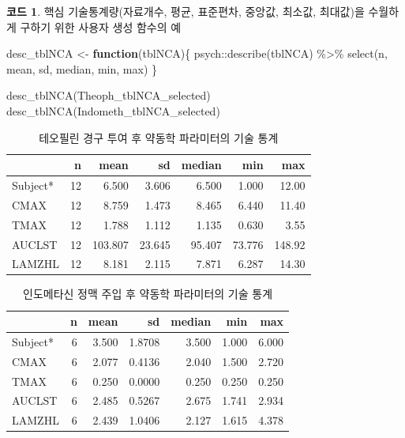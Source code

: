 \documentclass[
  11pt,
  krantz2, a4paper, twoside]{krantz}
\newenvironment{Shaded}{\begin{snugshade}}{\end{snugshade}}
\newcommand{\ControlFlowTok}[1]{\textcolor[rgb]{0.13,0.29,0.53}{\textbf{#1}}}
\newcommand{\FunctionTok}[1]{\textcolor[rgb]{0.00,0.00,0.00}{#1}}
\newcommand{\NormalTok}[1]{#1}
\newcommand{\OtherTok}[1]{\textcolor[rgb]{0.56,0.35,0.01}{#1}}
\newcommand{\SpecialCharTok}[1]{\textcolor[rgb]{0.00,0.00,0.00}{#1}}
\theoremstyle{definition}
\theoremstyle{definition}
\newtheorem{example}{코드}[chapter]
\theoremstyle{definition}
\theoremstyle{definition}
\theoremstyle{remark}
\begin{document}
\begin{example}
\protect\hypertarget{exm:desctblnca}{}{\label{exm:desctblnca} }핵심 기술통계량(자료개수, 평균, 표준편차, 중앙값, 최소값, 최대값)을 수월하게 구하기 위한 사용자 생성 함수의 예
\end{example}
\vspace{-2ex}

\begin{Shaded}
\begin{Highlighting}[]
\NormalTok{desc\_tblNCA }\OtherTok{\textless{}{-}} \ControlFlowTok{function}\NormalTok{(tblNCA)\{}
\NormalTok{  psych}\SpecialCharTok{::}\FunctionTok{describe}\NormalTok{(tblNCA) }\SpecialCharTok{\%\textgreater{}\%}
    \FunctionTok{select}\NormalTok{(n, mean, sd, median, min, max)}
\NormalTok{\}}
\end{Highlighting}
\end{Shaded}

\begin{Shaded}
\begin{Highlighting}[]
\FunctionTok{desc\_tblNCA}\NormalTok{(Theoph\_tblNCA\_selected)}
\FunctionTok{desc\_tblNCA}\NormalTok{(Indometh\_tblNCA\_selected)}
\end{Highlighting}
\end{Shaded}

\begin{table}

\caption{\label{tab:theodesc}테오필린 경구 투여 후 약동학 파라미터의 기술 통계}
\centering
\begin{tabular}[t]{lrrrrrr}
\toprule
  & n & mean & sd & median & min & max\\
\midrule
Subject* & 12 & 6.500 & 3.606 & 6.500 & 1.000 & 12.00\\
CMAX & 12 & 8.759 & 1.473 & 8.465 & 6.440 & 11.40\\
TMAX & 12 & 1.788 & 1.112 & 1.135 & 0.630 & 3.55\\
AUCLST & 12 & 103.807 & 23.645 & 95.407 & 73.776 & 148.92\\
LAMZHL & 12 & 8.181 & 2.115 & 7.871 & 6.287 & 14.30\\
\bottomrule
\end{tabular}
\end{table}

\begin{table}

\caption{\label{tab:indodesc}인도메타신 정맥 주입 후 약동학 파라미터의 기술 통계}
\centering
\begin{tabular}[t]{lrrrrrr}
\toprule
  & n & mean & sd & median & min & max\\
\midrule
Subject* & 6 & 3.500 & 1.8708 & 3.500 & 1.000 & 6.000\\
CMAX & 6 & 2.077 & 0.4136 & 2.040 & 1.500 & 2.720\\
TMAX & 6 & 0.250 & 0.0000 & 0.250 & 0.250 & 0.250\\
AUCLST & 6 & 2.485 & 0.5267 & 2.675 & 1.741 & 2.934\\
LAMZHL & 6 & 2.439 & 1.0406 & 2.127 & 1.615 & 4.378\\
\bottomrule
\end{tabular}
\end{table}
\end{document}
